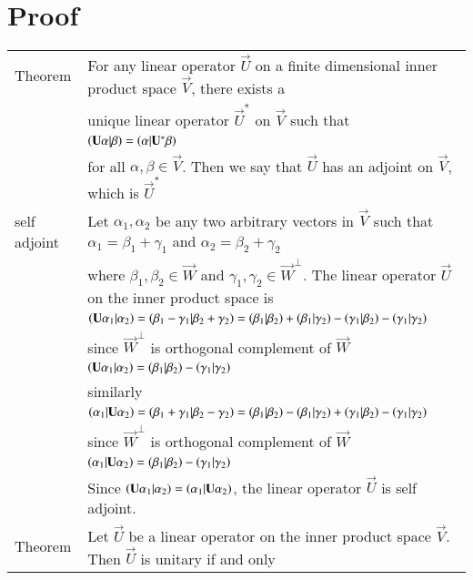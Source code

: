 \documentclass[journal,12pt]{IEEEtran}
\begin{document}
\section{Proof}
\renewcommand{\thetable}{2}
\begin{longtable}{|l|l|}
    \hline
    Theorem&For any linear operator $\vec{U}$ on a finite dimensional inner product space $\vec{V}$, there exists a\\
    & unique linear operator $\vec{U}^*$ on $\vec{V}$ such that\\
    &\qquad\qquad\qquad $\left(\mathbf{U}\alpha\vert\beta\right)=\left(\alpha\vert\mathbf{U}^*\beta\right)$\\
    &for all $\alpha,\beta\in\vec{V}$. Then we say that $\vec{U}$ has an adjoint on $\vec{V}$, which is $\vec{U}^*$\\
    \hline
    self adjoint& Let $\alpha_1,\alpha_2$ be any two arbitrary vectors in $\vec{V}$ such that $\alpha_1=\beta_1+\gamma_1$ and $\alpha_2=\beta_2+\gamma_2$\\
    & where $\beta_1,\beta_2\in\vec{W}$ and $\gamma_1,\gamma_2\in\vec{W}^\perp$. The linear operator $\vec{U}$ on the inner product space is\\
    &\qquad$\left(\mathbf{U}\alpha_1\vert\alpha_2\right)=\left(\beta_1-\gamma_1\vert\beta_2+\gamma_2\right)=\left(\beta_1\vert\beta_2\right)+\left(\beta_1\vert\gamma_2\right)-\left(\gamma_1\vert\beta_2\right)-\left(\gamma_1\vert\gamma_2\right)$\\
    &\qquad since $\vec{W}^\perp$ is orthogonal complement of $\vec{W}$\\
    &\qquad$\left(\mathbf{U}\alpha_1\vert\alpha_2\right)=\left(\beta_1\vert\beta_2\right)-\left(\gamma_1\vert\gamma_2\right)$\\
    &similarly\\
    &\qquad$\left(\alpha_1\vert\mathbf{U}\alpha_2\right)=\left(\beta_1+\gamma_1\vert\beta_2-\gamma_2\right)=\left(\beta_1\vert\beta_2\right)-\left(\beta_1\vert\gamma_2\right)+\left(\gamma_1\vert\beta_2\right)-\left(\gamma_1\vert\gamma_2\right)$\\
    &\qquad since $\vec{W}^\perp$ is orthogonal complement of $\vec{W}$\\
    &\qquad$\left(\alpha_1\vert\mathbf{U}\alpha_2\right)=\left(\beta_1\vert\beta_2\right)-\left(\gamma_1\vert\gamma_2\right)$\\
    & Since $\left(\mathbf{U}\alpha_1\vert\alpha_2\right)=\left(\alpha_1\vert\mathbf{U}\alpha_2\right)$, the linear operator $\vec{U}$ is self adjoint.\\
    \hline
    Theorem&Let $\vec{U}$ be a linear operator on the inner product space $\vec{V}$. Then $\vec{U}$ is unitary if and only\\

\end{longtable}
\end{document}
